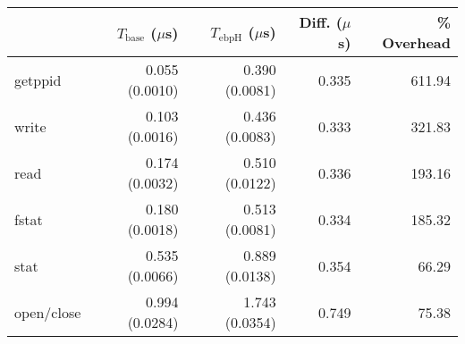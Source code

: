\begin{tabular}{>{\ttfamily}lrrrr}
\toprule
\multicolumn{1}{l}{System Call} & $T_\text{base}$ ($\mu$s) & $T_\text{ebpH}$ ($\mu$s) & Diff. ($\mu$s) & \% Overhead \\
\midrule
                        getppid &           0.055 (0.0010) &           0.390 (0.0081) &          0.335 &      611.94 \\
                          write &           0.103 (0.0016) &           0.436 (0.0083) &          0.333 &      321.83 \\
                           read &           0.174 (0.0032) &           0.510 (0.0122) &          0.336 &      193.16 \\
                          fstat &           0.180 (0.0018) &           0.513 (0.0081) &          0.334 &      185.32 \\
                           stat &           0.535 (0.0066) &           0.889 (0.0138) &          0.354 &       66.29 \\
                     open/close &           0.994 (0.0284) &           1.743 (0.0354) &          0.749 &       75.38 \\
\bottomrule
\end{tabular}
